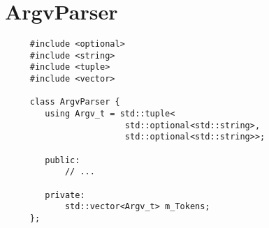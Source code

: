 \section*{ArgvParser}

\lstset{language=C++}
  \begin{lstlisting}
     #include <optional>
     #include <string>
     #include <tuple>
     #include <vector>
     
     class ArgvParser {
        using Argv_t = std::tuple<
                        std::optional<std::string>,
                        std::optional<std::string>>;
        
        public:
            // ...
        
        private:
            std::vector<Argv_t> m_Tokens;
     };
  \end{lstlisting}
  